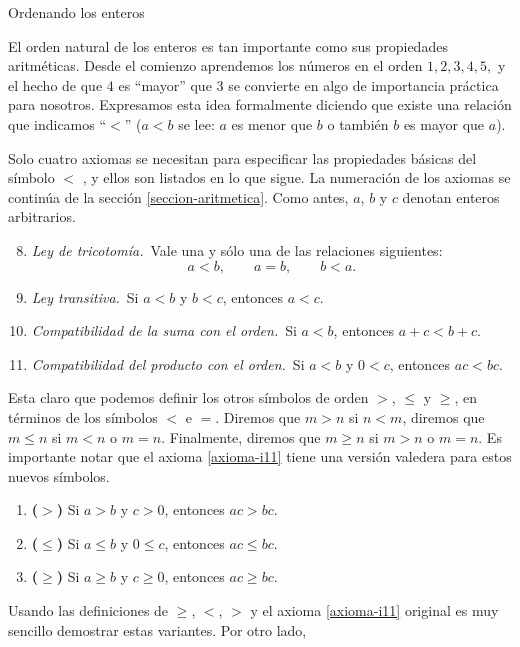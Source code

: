 \begin{section}{Ordenando los enteros}\label{seccion-ordenando-los-enteros}

El orden natural de los enteros es tan importante como sus propiedades aritméticas. Desde el comienzo aprendemos los números en el orden $1, 2, 3, 4, 5,$ y el hecho de que $4$ es ``mayor'' que $3$ se convierte en algo de importancia práctica para nosotros. Expresamos esta idea formalmente diciendo que existe una relación que indicamos ``$<$'' ($a < b$ se lee: $a$ es menor que $b$ o también $b$ es mayor que $a$). 

Solo cuatro axiomas se necesitan para especificar las propiedades básicas del símbolo $<$ , y ellos son listados en lo que sigue. La numeración de los axiomas se continúa de la sección \ref{seccion-aritmetica}. Como antes, $a$, $b$ y $c$ denotan enteros arbitrarios.

\begin{enumerate}[label=\textbf{I\arabic*)}, ref=\textbf{I\arabic*}]
    \setcounter{enumi}{7}
    \item \label{axioma-i8} \textit{Ley de tricotomía.}\, Vale una y sólo una de las relaciones
siguientes:
$$
a<b, \qquad a = b, \qquad b < a.
$$
\item \label{axioma-i9} \textit{Ley transitiva.}\, Si $a< b$ y $b < c$, entonces $a<c$.
\item \label{axioma-i10} \textit{Compatibilidad de la suma con el orden.}\, Si $a < b$, entonces $a+c < b+c$. 
\item \label{axioma-i11} \textit{Compatibilidad del producto con el orden.}\, Si $a< b$ y $0< c$, entonces $ac < bc$. 
\end{enumerate}


Esta claro que podemos definir los otros símbolos de orden $>$, $\le$ y $\ge$, en términos de los símbolos $<$ e $=$. Diremos que $m>n$ si  $n<m$, diremos que $m \le n$ si $m<n$ o $m=n$. Finalmente, diremos que $m \ge n$ si $m > n$ o $m=n$.  Es importante notar que el  axioma \ref{axioma-i11} tiene una versión valedera para estos nuevos símbolos.
\begin{enumerate}[label=\textit{\alph*)}]
\item \textbf{($>$)} Si $a > b$ y $c>0$, entonces $ac > bc$.
\item \textbf{($\le$)} Si $a \le b$ y $0 \le c$, entonces $ac \le bc$.
\item \textbf{($\ge$)} Si $a\ge b$ y $c\ge 0$, entonces $ac \ge bc$.
\end{enumerate}
Usando las definiciones de $\ge$, $<$, $>$ y el axioma \ref{axioma-i11} original es muy sencillo demostrar estas variantes. Por otro lado,


\end{section}
